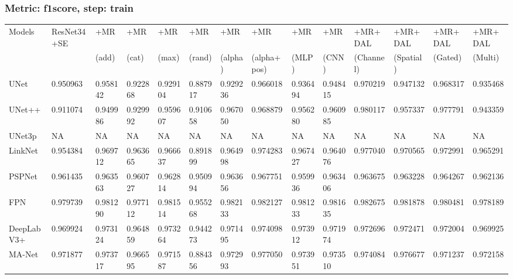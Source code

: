 \documentclass{article}
\begin{document}
\subsubsection{Metric: f1score, step: train}
\begin{tabular}{llllllllllllll}
\toprule
Models & ResNet34+SE & +MR  & +MR  & +MR  & +MR  & +MR  & +MR  & +MR  & +MR  & +MR+DAL & +MR+DAL & +MR+DAL & +MR+DAL \\
       &             &  (add) &  (cat) &  (max) &  (rand) &  (alpha) &  (alpha+pos) &  (MLP) &  (CNN) & (Channel) & (Spatial) & (Gated) & (Multi) \\
\midrule
UNet & 0.950963 & 0.958142 & 0.922868 & 0.929104 & 0.887917 & 0.929236 & 0.966018 & 0.936494 & 0.948415 & 0.970219 & 0.947132 & 0.968317 & 0.935468 \\
UNet++ & 0.911074 & 0.949986 & 0.929992 & 0.959607 & 0.910658 & 0.967050 & 0.968879 & 0.956280 & 0.960985 & 0.980117 & 0.957337 & 0.977791 & 0.943359 \\
UNet3p & NA & NA & NA & NA & NA & NA & NA & NA & NA & NA & NA & NA & NA \\
LinkNet & 0.954384 & 0.969712 & 0.963665 & 0.966637 & 0.891899 & 0.964998 & 0.974283 & 0.967427 & 0.964076 & 0.977040 & 0.970565 & 0.972991 & 0.965291 \\
PSPNet & 0.961435 & 0.963563 & 0.960727 & 0.962814 & 0.950994 & 0.963656 & 0.967751 & 0.959936 & 0.963406 & 0.963675 & 0.963228 & 0.964267 & 0.962136 \\
FPN & 0.979739 & 0.981290 & 0.977112 & 0.981514 & 0.955268 & 0.982133 & 0.982127 & 0.981233 & 0.981635 & 0.982675 & 0.981878 & 0.980481 & 0.978189 \\
DeepLabV3+ & 0.969924 & 0.973124 & 0.964859 & 0.973264 & 0.944273 & 0.971495 & 0.974098 & 0.973912 & 0.971974 & 0.972696 & 0.972471 & 0.972004 & 0.969925 \\
MA-Net & 0.971877 & 0.973717 & 0.966595 & 0.971587 & 0.884356 & 0.972993 & 0.977050 & 0.973951 & 0.973510 & 0.974084 & 0.976677 & 0.971237 & 0.972158 \\
\bottomrule
\end{tabular}
\end{document}
